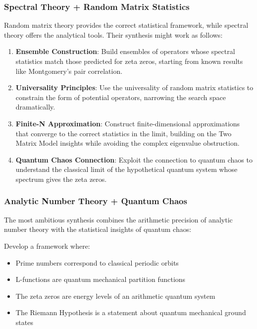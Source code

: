 \subsubsection{Spectral Theory + Random Matrix Statistics}
\label{subsubsec:spectral_rmt}

Random matrix theory provides the correct statistical framework, while spectral theory offers the analytical tools. Their synthesis might work as follows:

\begin{approach}
\begin{enumerate}
\item \textbf{Ensemble Construction}: Build ensembles of operators whose spectral statistics match those predicted for zeta zeros, starting from known results like Montgomery's pair correlation.

\item \textbf{Universality Principles}: Use the universality of random matrix statistics to constrain the form of potential operators, narrowing the search space dramatically.

\item \textbf{Finite-N Approximation}: Construct finite-dimensional approximations that converge to the correct statistics in the limit, building on the Two Matrix Model insights while avoiding the complex eigenvalue obstruction.

\item \textbf{Quantum Chaos Connection}: Exploit the connection to quantum chaos to understand the classical limit of the hypothetical quantum system whose spectrum gives the zeta zeros.
\end{enumerate}
\end{approach}

\subsubsection{Analytic Number Theory + Quantum Chaos}
\label{subsubsec:ant_quantum}

The most ambitious synthesis combines the arithmetic precision of analytic number theory with the statistical insights of quantum chaos:

\begin{approach}
Develop a framework where:
\begin{itemize}
\item Prime numbers correspond to classical periodic orbits
\item L-functions are quantum mechanical partition functions
\item The zeta zeros are energy levels of an arithmetic quantum system
\item The Riemann Hypothesis is a statement about quantum mechanical ground states
\end{itemize}
\end{approach}

